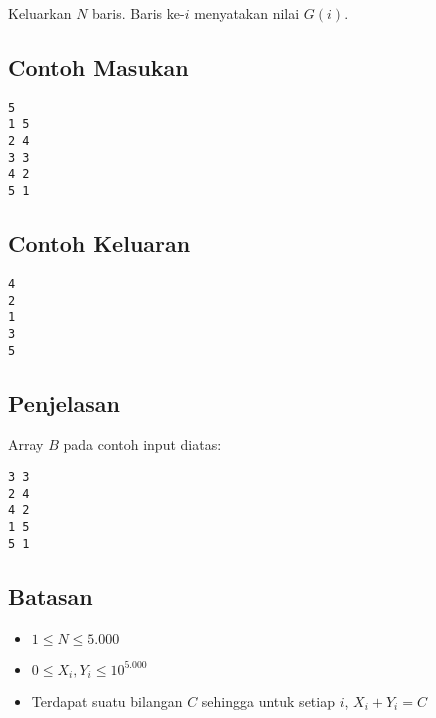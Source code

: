 \documentclass{article}
\begin{document}
\par\noindent Keluarkan $N$ baris. Baris ke-$i$ menyatakan nilai $G(i)$.

\subsection*{Contoh Masukan}

\begin{lstlisting}
5
1 5
2 4
3 3
4 2
5 1
\end{lstlisting}

\subsection*{Contoh Keluaran}

\begin{lstlisting}
4
2
1
3
5
\end{lstlisting}

\subsection*{Penjelasan}

\par\noindent Array $B$ pada contoh input diatas:
\begin{lstlisting}
3 3
2 4
4 2
1 5
5 1
\end{lstlisting}

\subsection*{Batasan}

\begin{itemize}
	\item $1 \leq N \leq 5.000$
	\item $0 \leq X_i, Y_i \leq 10^{5.000}$
	\item Terdapat suatu bilangan $C$ sehingga untuk setiap $i$, $X_i + Y_i = C$
\end{itemize}
\end{document}

